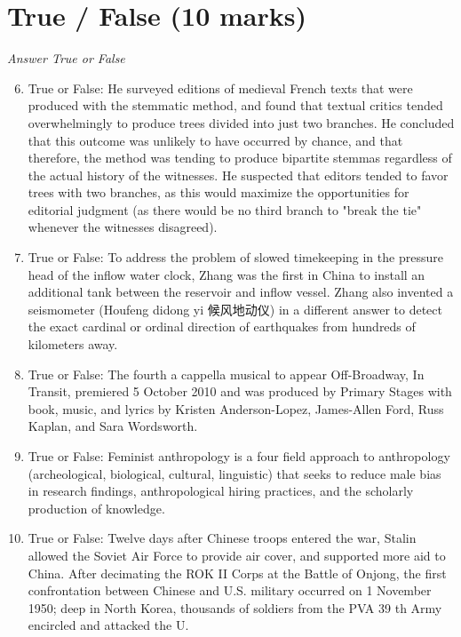 \documentclass[12pt]{article}
\begin{document}
\section*{True / False (10 marks)}
\textit{Answer True or False}
\begin{enumerate}[label=\arabic*.]
\setcounter{enumi}{5}
\item True or False: He surveyed editions of medieval French texts that were produced with the stemmatic method, and found that textual critics tended overwhelmingly to produce trees divided into just two branches. He concluded that this outcome was unlikely to have occurred by chance, and that therefore, the method was tending to produce bipartite stemmas regardless of the actual history of the witnesses. He suspected that editors tended to favor trees with two branches, as this would maximize the opportunities for editorial judgment (as there would be no third branch to "break the tie" whenever the witnesses disagreed).
\item True or False: To address the problem of slowed timekeeping in the pressure head of the inflow water clock, Zhang was the first in China to install an additional tank between the reservoir and inflow vessel. Zhang also invented a seismometer (Houfeng didong yi 候风地动仪) in a different answer to detect the exact cardinal or ordinal direction of earthquakes from hundreds of kilometers away.
\item True or False: The fourth a cappella musical to appear Off-Broadway, In Transit, premiered 5 October 2010 and was produced by Primary Stages with book, music, and lyrics by Kristen Anderson-Lopez, James-Allen Ford, Russ Kaplan, and Sara Wordsworth.
\item True or False: Feminist anthropology is a four field approach to anthropology (archeological, biological, cultural, linguistic) that seeks to reduce male bias in research findings, anthropological hiring practices, and the scholarly production of knowledge.
\item True or False: Twelve days after Chinese troops entered the war, Stalin allowed the Soviet Air Force to provide air cover, and supported more aid to China. After decimating the ROK II Corps at the Battle of Onjong, the first confrontation between Chinese and U.S. military occurred on 1 November 1950; deep in North Korea, thousands of soldiers from the PVA 39 th Army encircled and attacked the U.
\end{enumerate}
\end{document}

